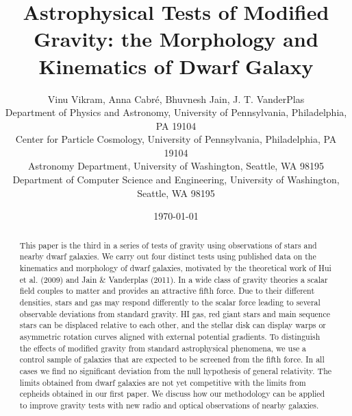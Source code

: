 \documentclass[useAMS,usenatbib,twocolumn]{mn2e}
\begin{document}
\title[Astrophysical Tests of Modified Gravity]{Astrophysical Tests
of Modified Gravity: the Morphology and Kinematics of Dwarf Galaxy} 
\author[Vikram, V. {\it et al.}]{Vinu Vikram, Anna Cabr\'e, Bhuvnesh Jain, J.
T. VanderPlas\\
  Department of Physics and Astronomy, University of Pennsylvania, 
  Philadelphia, PA 19104\\
  Center for Particle Cosmology, University of Pennsylvania, 
  Philadelphia, PA 19104\\
  Astronomy Department, University of Washington,
  Seattle, WA 98195\\
  Department of Computer Science and Engineering, University of Washington,
  Seattle, WA 98195
}

\date{\today}
\maketitle


\begin{abstract}
This paper is the third in a series of tests of gravity using observations of 
stars and nearby
dwarf galaxies. We carry out four distinct tests using published data on the
kinematics
and morphology of dwarf galaxies, motivated by the theoretical work of
Hui et al. (2009) and Jain \& Vanderplas (2011). In a wide class of
gravity theories a scalar field couples to matter and provides an attractive
fifth force. Due to their different densities,
stars and gas may respond differently to the scalar force leading
to several observable deviations from standard gravity.  
HI gas, red giant stars and main sequence stars
can be displaced relative to each other,
and the stellar disk can display warps or asymmetric rotation curves
aligned with external potential gradients.  
To distinguish the effects of modified
gravity from standard astrophysical phenomena, we use a control sample of
galaxies that are expected to be screened from the fifth force.
In all cases we find no significant deviation
from the null hypothesis of general relativity. The limits obtained from dwarf galaxies are not yet competitive with the limits from cepheids obtained in our first paper. 
We discuss how our methodology can be applied to improve gravity tests with 
new radio and optical observations of nearby galaxies.
\nocite{hui09, bhuvjake2011}
\end{abstract}
\end{document}

